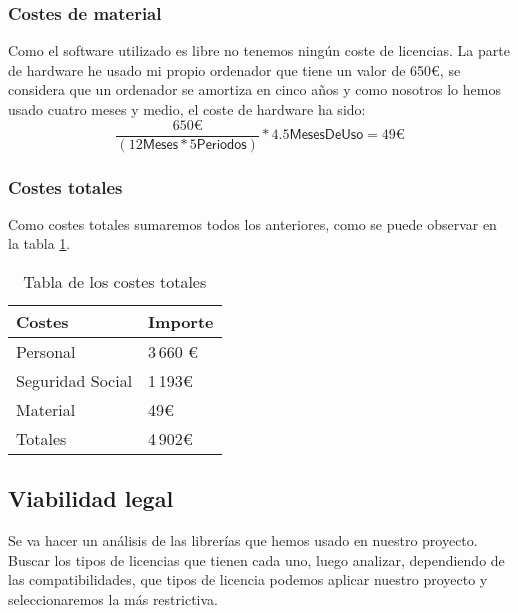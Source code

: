 \subsubsection{Costes de material}
Como el software utilizado es libre no tenemos ningún coste de licencias. La parte de hardware he usado mi propio ordenador que tiene un valor de 650\euro, se considera que un ordenador se amortiza en cinco años y como nosotros lo hemos usado cuatro meses y medio, el coste de hardware ha sido:
\[\frac{650\euro}{(12\textsf{Meses}*5\textsf{Periodos})}*4.5\textsf{MesesDeUso}=49\euro\]
\subsubsection{Costes totales}
Como costes totales sumaremos todos los anteriores, como se puede observar en la tabla \ref{tab:costes}.

\begin{table}[]
\centering
\caption{Tabla de los costes totales}
\label{tab:costes}
\begin{tabular}{p{4cm} p{2cm}}
\toprule
Costes & Importe \\ \midrule
Personal         & 3\,660 \euro{}   \\ 
Seguridad Social & 1\,193\euro{} \\ 
Material         & 49\euro{}   \\ 
Totales             & 4\,902\euro{} \\ \bottomrule
\end{tabular}
\end{table}

\subsection{Viabilidad legal}
Se va hacer un análisis de las librerías que hemos usado en nuestro proyecto. Buscar los tipos de licencias que tienen cada uno, luego analizar, dependiendo de las compatibilidades, que tipos de licencia podemos aplicar nuestro proyecto y seleccionaremos la más restrictiva.

